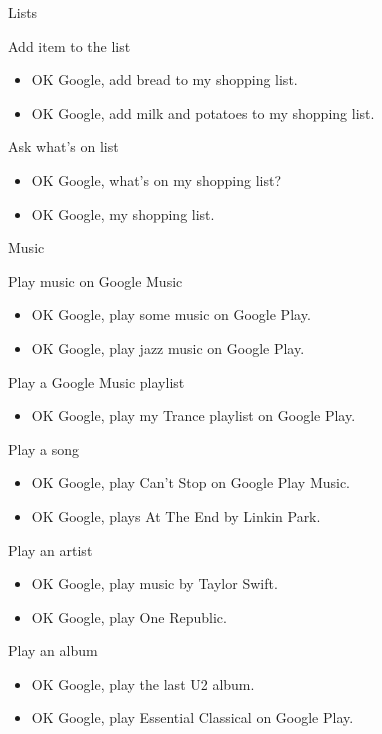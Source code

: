 \documentclass[
  letterpaper,
  DIV=11,
  numbers=noendperiod]{scrartcl}
\providecommand{\tightlist}{%
  \setlength{\itemsep}{0pt}\setlength{\parskip}{0pt}}\usepackage{longtable,booktabs,array}
\begin{document}
Lists

Add item to the list

\begin{itemize}
\item
  OK Google, add bread to my shopping list.
\item
  OK Google, add milk and potatoes to my shopping list.
\end{itemize}

Ask what's on list

\begin{itemize}
\item
  OK Google, what's on my shopping list?
\item
  OK Google, my shopping list.
\end{itemize}

Music

Play music on Google Music

\begin{itemize}
\item
  OK Google, play some music on Google Play.
\item
  OK Google, play jazz music on Google Play.
\end{itemize}

Play a Google Music playlist

\begin{itemize}
\tightlist
\item
  OK Google, play my Trance playlist on Google Play.
\end{itemize}

Play a song

\begin{itemize}
\item
  OK Google, play Can't Stop on Google Play Music.
\item
  OK Google, plays At The End by Linkin Park.
\end{itemize}

Play an artist

\begin{itemize}
\item
  OK Google, play music by Taylor Swift.
\item
  OK Google, play One Republic.
\end{itemize}

Play an album

\begin{itemize}
\item
  OK Google, play the last U2 album.
\item
  OK Google, play Essential Classical on Google Play.
\end{itemize}
\end{document}
